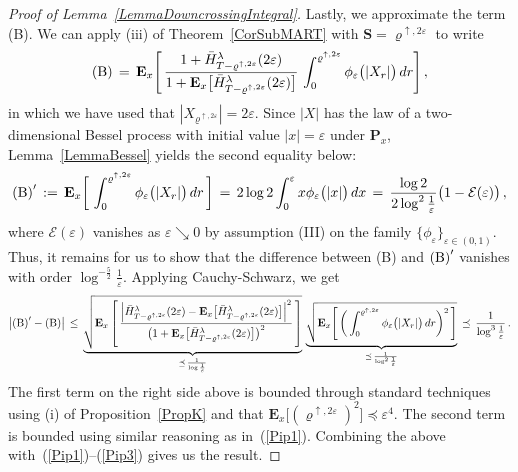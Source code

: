 \documentclass[10pt]{article}
\numberwithin{equation}{section}
\theoremstyle{definition}
\begin{document}
\begin{proof} [Proof of Lemma~\ref{LemmaDowncrossingIntegral}]
Lastly, we approximate   the term (B).   We can apply (iii) of Theorem~\ref{CorSubMART} with $\mathbf{S}=\varrho^{\uparrow,2\varepsilon}$ to write
\begin{align} \label{Pipple}
\textup{(B)}\,=\,\mathbf{E}_{x}\Bigg[ \, \frac{1+ \bar{H}^{\lambda}_{T-\varrho^{\uparrow,2\varepsilon}}(2\varepsilon) }{ 1+\mathbf{E}_{x}\big[ \bar{H}^{\lambda}_{T-\varrho^{\uparrow,2\varepsilon}}(2\varepsilon)   \big]  } \,\int_{ 0}^{\varrho^{\uparrow,2\varepsilon} }      \phi_{\varepsilon}\big(|X_r|\big) \,dr \Bigg]\,,
\end{align}
in which we have used that $|X_{\varrho^{\uparrow,2\varepsilon}}|=2\varepsilon$.  Since $ |X| $ has the law of a two-dimensional Bessel process with initial value $|x|=\varepsilon$ under $\mathbf{P}_x$, Lemma~\ref{LemmaBessel} yields the second equality below:
\begin{align} \label{Pip3}
\textup{(B)}'\,:=\,\mathbf{E}_{x}\bigg[ \, \int_{ 0}^{\varrho^{\uparrow,2\varepsilon} }      \phi_{\varepsilon}\big(|X_r|\big) \,dr\, \bigg]\,=\,2\log 2
 \int_0^{\varepsilon} x\phi_{\varepsilon}\big(|x|\big)\,dx\, =\,\frac{ \log 2  }{ 2\log^2 \frac{1}{\varepsilon} 
 }\big(1-\mathcal{E}(\varepsilon)  \big)\,,
\end{align}
where $\mathcal{E}(\varepsilon)$ vanishes as $\varepsilon\searrow 0$ by assumption (III) on the family $\{\phi_{\varepsilon}  \}_{\varepsilon\in (0,1) }$. Thus, it remains for us to show that  the difference between (B) and $\textup{(B)}'$ vanishes with   order $\log^{-\frac{5}{2}} \frac{1}{\varepsilon}  $.  Applying Cauchy-Schwarz, we get
\begin{align*}
\big|\textup{(B)}'-\textup{(B)}\big|\,\leq \,\underbrace{\sqrt{\mathbf{E}_{x}\left[ \, \frac{\Big|\bar{H}^{\lambda}_{T-\varrho^{\uparrow,2\varepsilon}}(2\varepsilon) -\mathbf{E}_{x}\big[ \bar{H}^{\lambda}_{T-\varrho^{\uparrow,2\varepsilon}}(2\varepsilon)   \big]   \Big|^2 }{ \big(1+\mathbf{E}_{x}\big[ \bar{H}^{\lambda}_{T-\varrho^{\uparrow,2\varepsilon}}(2\varepsilon)   \big]\big)^2  } \,\right] }}_{ \preceq \,\frac{1}{ \log \frac{1}{\varepsilon}  }    }  \, \underbrace{\sqrt{\mathbf{E}_{x}\Bigg[ \, \bigg(\int_{ 0}^{\varrho^{\uparrow,2\varepsilon} }      \phi_{\varepsilon}\big(|X_r|\big)\,dr  \bigg)^2 \,\Bigg] }}_{ \preceq \, \frac{ 1}{ \log^2 \frac{1}{\varepsilon}  }  }\,\preceq\, \frac{ 1 }{ \log^3 \frac{1}{\varepsilon}  } \,.
\end{align*}
The first term on the right side above is bounded through standard techniques using (i) of Proposition~\ref{PropK} and that $\mathbf{E}_{x}\big[(\varrho^{\uparrow,2\varepsilon})^2\big]\preceq \varepsilon^4$.  The second term is bounded using similar reasoning as in~(\ref{Pip1}).
Combining the above with~(\ref{Pip1})--(\ref{Pip3}) gives us the result.
\end{proof}
\end{document}
